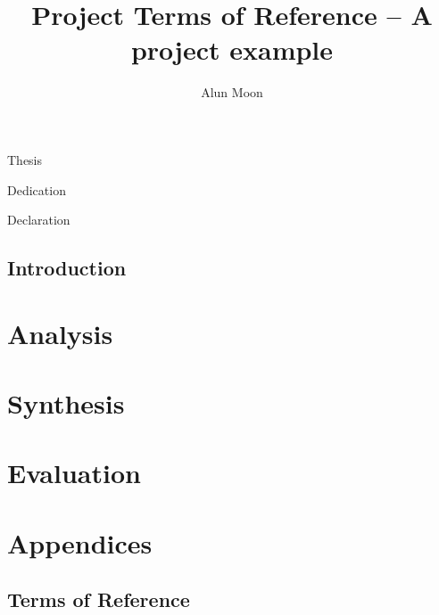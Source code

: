 \documentclass[12pt]{book}
\title{Project Terms of Reference -- A project example}
\author{Alun Moon}
\begin{document}
\frontmatter
\begin{titlepage}
    Thesis
\end{titlepage}

\newpage
Dedication

\newpage
Declaration

\tableofcontents

\mainmatter
\chapter{Introduction}

\part{Analysis}

\part{Synthesis}

\part{Evaluation}





\part{Appendices}
\appendix

\chapter{Terms of Reference}

\end{document}
